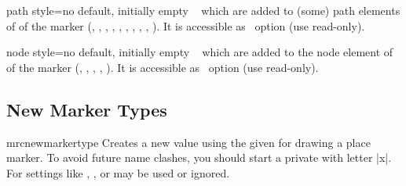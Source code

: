 \begin{docMrcKey}[marker]{path style}{=}{no default, initially empty}
  \tikzname\  which are added to (some) path elements of
  of the marker
  (, , , ,
    , , , ,
    , ).
  It is accessible as \tikzname\ option  (use read-only).
\end{docMrcKey}

\begin{docMrcKey}[marker]{node style}{=}{no default, initially empty}
  \tikzname\  which are added to the node element of
  of the marker
  (, , , , ).
  It is accessible as \tikzname\ option  (use read-only).
\end{docMrcKey}



\subsection{New Marker Types}

\begin{docCommand}{mrcnewmarkertype}{}
  Creates a new  value  using the
  given  for drawing a place marker.
  To avoid future name clashes, you should start a private 
  with letter |x|. For  settings like
  ,
  , or  may be used
  or ignored.

  \begin{dispExample}
  \end{dispExample}
\end{docCommand}



